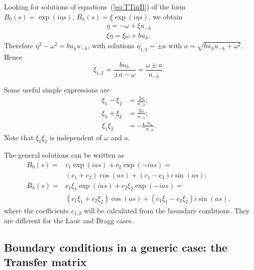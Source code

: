 \documentclass[preprint]{iucr}              %
\begin{document}
Looking for solutions of equations~(\ref{eq:TTinB}) of the form $B_0(s)=\exp(i \eta s)$, $B_h(s)=\xi \exp(i \eta s)$,  we obtain
\begin{equation}
    \begin{split}
        \eta =-\omega + \xi u_{-h} \\
         \xi \eta=\xi \omega+b u_h.
    \end{split}
\end{equation}
Therefore $\eta^2-\omega^2=b u_h u_{-h}$,
with solutions $\eta_{1,2}=\pm a$  with $\boxed{a=\sqrt{b u_h u_{-h}+\omega^2}}$.
Hence
\begin{equation}\label{eq:xis}
\xi_{1,2}=\frac{b u_h}{\pm a-\omega} = \frac{\omega \pm a}{u_{-h}}.    
\end{equation}

Some useful simple expressions are
\begin{subequations}
\label{eq:TTuseful}
\begin{align}
\xi_1-\xi_2 &= \frac{2 a}{u_{-h}};\\
\xi_1+\xi_2 &= \frac{2 \omega}{u_{-h}};\\
\xi_1 \xi_2 &= -b \frac{u_h}{u_{-h}}.
\end{align}
\end{subequations}
Note that $\xi_1\xi_2$ is independent of $\omega$ and $a$.

The general solutions can be written as 
\begin{subequations}
\label{eq:BSolutions}
\begin{align}
B_0(s) = &c_1 \exp(i a s) + c_2 \exp(-i a s) = \nonumber\\ &(c_1+c_2) \cos(as) + (c_1-c_2) i \sin(as); \\
B_h(s) = &c_1 \xi_1 \exp(i a s) + c_2 \xi_2 \exp(-i a s) = \nonumber \\
&(c_1 \xi_1+c_2 \xi_2) \cos(as) + (c_1 \xi_1-c_2 \xi_2) i \sin(as),
\end{align}
\end{subequations}
where the coefficients $c_{1,2}$ will be calculated from the boundary conditions. They are different for the Laue and Bragg cases.

\subsection{Boundary conditions in a generic case: the Transfer matrix}
\label{sec:transferMatrix}
\end{document}
